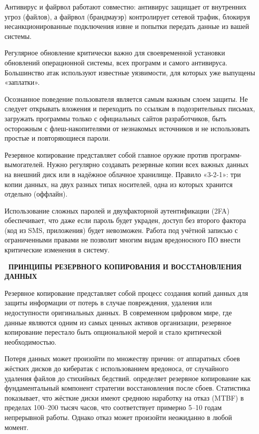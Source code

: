 \documentclass{SibFU-docs}
\begin{document}
Антивирус и файрвол работают совместно: антивирус защищает от внутренних угроз (файлов), а файрвол (брандмауэр) контролирует сетевой трафик, блокируя несанкционированные подключения извне и попытки передать данные из вашей системы.

Регулярное обновление критически важно для своевременной установки обновлений операционной системы, всех программ и самого антивируса. Большинство атак используют известные уязвимости, для которых уже выпущены «заплатки».

Осознанное поведение пользователя является самым важным слоем защиты. Не следует открывать вложения и переходить по ссылкам в подозрительных письмах, загружать программы только с официальных сайтов разработчиков, быть осторожным с флеш-накопителями от незнакомых источников и не использовать простые и повторяющиеся пароли.

Резервное копирование представляет собой главное оружие против программ-вымогателей. Нужно регулярно создавать резервные копии всех важных данных на внешний диск или в надёжное облачное хранилище. Правило «3-2-1»: три копии данных, на двух разных типах носителей, одна из которых хранится отдельно (оффлайн).

Использование сложных паролей и двухфакторной аутентификации (2FA) обеспечивает, что даже если пароль будет украден, доступ без второго фактора (код из SMS, приложения) будет невозможен. Работа под учётной записью с ограниченными правами не позволит многим видам вредоносного ПО внести критические изменения в систему.

\newpage
{}
\begin{center}\textbf{\thesection\ ПРИНЦИПЫ РЕЗЕРВНОГО КОПИРОВАНИЯ И ВОССТАНОВЛЕНИЯ ДАННЫХ}\end{center}
\vspace*{-1.5em}

Резервное копирование представляет собой процесс создания копий данных для защиты информации от потерь в случае повреждения, удаления или недоступности оригинальных данных. В современном цифровом мире, где данные являются одним из самых ценных активов организации, резервное копирование перестало быть опциональной мерой и стало критической необходимостью.

Потеря данных может произойти по множеству причин: от аппаратных сбоев жёстких дисков до кибератак с использованием вредоноса, от случайного удаления файлов до стихийных бедствий. \cite{preston2007backup} определяет резервное копирование как фундаментальный компонент стратегии восстановления после сбоев. Статистика показывает, что жёсткие диски имеют среднюю наработку на отказ (MTBF) в пределах 100--200 тысяч часов, что соответствует примерно 5--10 годам непрерывной работы. Однако отказ может произойти неожиданно в любой момент.
\end{document}
